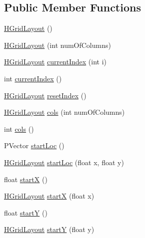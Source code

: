 \subsection*{Public Member Functions}
\begin{DoxyCompactItemize}
\item 
\hyperlink{classhype_1_1layout_1_1_h_grid_layout_a2c33aed75ce73b1c40407e2c2d35a808}{H\-Grid\-Layout} ()
\item 
\hyperlink{classhype_1_1layout_1_1_h_grid_layout_af9049b135092acaa2b510ccb4c986388}{H\-Grid\-Layout} (int num\-Of\-Columns)
\item 
\hyperlink{classhype_1_1layout_1_1_h_grid_layout}{H\-Grid\-Layout} \hyperlink{classhype_1_1layout_1_1_h_grid_layout_a3782685d8ec4be1ce2fd88ebcf060ba2}{current\-Index} (int i)
\item 
int \hyperlink{classhype_1_1layout_1_1_h_grid_layout_adb9ddaadedc689d2bdaf21d6a2cc1186}{current\-Index} ()
\item 
\hyperlink{classhype_1_1layout_1_1_h_grid_layout}{H\-Grid\-Layout} \hyperlink{classhype_1_1layout_1_1_h_grid_layout_a230026906e3a36146d6d81d981922fdd}{reset\-Index} ()
\item 
\hyperlink{classhype_1_1layout_1_1_h_grid_layout}{H\-Grid\-Layout} \hyperlink{classhype_1_1layout_1_1_h_grid_layout_a3247a2c2116262883439833914bd29a3}{cols} (int num\-Of\-Columns)
\item 
int \hyperlink{classhype_1_1layout_1_1_h_grid_layout_a4f6a3b79b183830f269d17ebcfb67fa5}{cols} ()
\item 
P\-Vector \hyperlink{classhype_1_1layout_1_1_h_grid_layout_ac4e3a8469570844dc974cceb8019e25f}{start\-Loc} ()
\item 
\hyperlink{classhype_1_1layout_1_1_h_grid_layout}{H\-Grid\-Layout} \hyperlink{classhype_1_1layout_1_1_h_grid_layout_a3da6a8788fa5048ff868616f29617e53}{start\-Loc} (float x, float y)
\item 
float \hyperlink{classhype_1_1layout_1_1_h_grid_layout_a7bbf02fcd85ed4e6953e30ac03df5b66}{start\-X} ()
\item 
\hyperlink{classhype_1_1layout_1_1_h_grid_layout}{H\-Grid\-Layout} \hyperlink{classhype_1_1layout_1_1_h_grid_layout_a471d1d2f0b5a91e025b49cbdf747c916}{start\-X} (float x)
\item 
float \hyperlink{classhype_1_1layout_1_1_h_grid_layout_ac47e7b4c4705ae384c6d9b88e23a1002}{start\-Y} ()
\item 
\hyperlink{classhype_1_1layout_1_1_h_grid_layout}{H\-Grid\-Layout} \hyperlink{classhype_1_1layout_1_1_h_grid_layout_a8c0e18120f08a017cb75680f9ea37b36}{start\-Y} (float y)

\end{DoxyCompactItemize}
